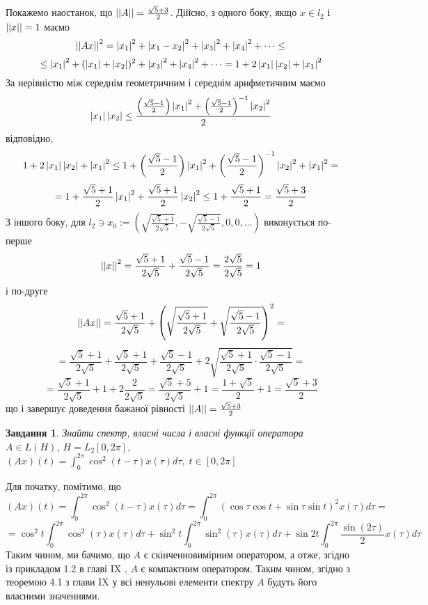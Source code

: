 \documentclass[12pt]{article} %
\newtheorem{prob}{Завдання}
\begin{document}
	Покажемо наостанок, що $\left|\left|A\right|\right|=\frac{\sqrt{5}+3}{2}$. Дійсно, з одного боку, якщо $x\in l_2$ і $\left|\left|x\right|\right|=1$ маємо
	\[\left|\left|Ax\right|\right|^2=\left|x_1\right|^2+\left|x_1-x_2\right|^2+\left|x_3\right|^2+\left|x_4\right|^2+\dots\leq\]
	\[\leq \left|x_1\right|^2+(\left|x_1\right|+\left|x_2\right|)^2+\left|x_3\right|^2+\left|x_4\right|^2+\dots=1+2\left|x_1\right|\left|x_2\right|+\left|x_1\right|^2\]
	За нерівністю між середнім геометричним і середнім арифметичним маємо
	\[\left|x_1\right|\left|x_2\right|\leq\frac{\left({\frac{\sqrt{5}-1}{2}}\right)\left|x_1\right|^2+\left(\frac{\sqrt{5}-1}{2}\right)^{-1}\left|x_2\right|^2}{2}\]
	відповідно,
	\[1+2\left|x_1\right|\left|x_2\right|+\left|x_1\right|^2
	\leq1+\left({\frac{\sqrt{5}-1}{2}}\right)\left|x_1\right|^2+\left(\frac{\sqrt{5}-1}{2}\right)^{-1}\left|x_2\right|^2+\left|x_1\right|^2=\]
	\[=1+\frac{\sqrt{5}+1}{2}\left|x_1\right|^2+\frac{\sqrt{5}+1}{2}\left|x_2\right|^2\leq 1+\frac{\sqrt{5}+1}{2}=\frac{\sqrt{5}+3}{2}\]
	З іншого боку, для $l_2\ni x_0:=(\sqrt{\frac{\sqrt{5}+1}{2\sqrt{5}}},-\sqrt{\frac{\sqrt{5}-1}{2\sqrt{5}}},0,0,\dots)$ виконується
	по-перше
	\[\left|\left|x\right|\right|^2=\frac{\sqrt{5}+1}{2\sqrt{5}}+\frac{\sqrt{5}-1}{2\sqrt{5}}=\frac{2\sqrt{5}}{2\sqrt{5}}=1\]
	і по-друге
	\[\left|\left|Ax\right|\right|=\frac{\sqrt{5}+1}{2\sqrt{5}}+\left(\sqrt{\frac{\sqrt{5}+1}{2\sqrt{5}}}+\sqrt{\frac{\sqrt{5}-1}{2\sqrt{5}}}\right)^2=\]\[=
	\frac{\sqrt{5}+1}{2\sqrt{5}}+\frac{\sqrt{5}+1}{2\sqrt{5}}+{\frac{\sqrt{5}-1}{2\sqrt{5}}}+2\sqrt{
	\frac{\sqrt{5}+1}{2\sqrt{5}}\cdot\frac{\sqrt{5}-1}{2\sqrt{5}}}=\]
	\[=\frac{\sqrt{5}+1}{2\sqrt{5}}+1+2\frac{2}{2\sqrt{5}}=\frac{\sqrt{5}+5}{2\sqrt{5}}+1=\frac{1+\sqrt{5}}{2}+1=\frac{\sqrt{5}+3}{2}\]
	що і завершує доведення бажаної рівності $\left|\left|A\right|\right|=\frac{\sqrt{5}+3}{2}$
\begin{prob}Знайти спектр, власні числа і власні функції оператора $A\in L(H)$, $H=L_2[0,2\pi]$, $(Ax)(t)=\int_0^{2\pi}\cos^2(t-\tau)x(\tau)
	d\tau,\;t\in[0,2\pi]$
\end{prob}
Для початку, помітимо, що
\newcommand{\myint}[1]{\int_0^{2\pi}#1x(\tau)d\tau}
\[(Ax)(t)=\int_0^{2\pi}\cos^2(t-\tau)x(\tau)d\tau=\int_0^{2\pi}(\cos\tau\cos t+\sin\tau\sin t)^2x(\tau)d\tau=\]
\[=\cos^2 t\myint{\cos^2(\tau)}+\sin^2 t\myint{\sin^2(\tau)}+\sin 2t\myint{\frac{\sin (2\tau)}{2}}\]
Таким чином, ми бачимо, що $A$ є скінченновимірним оператором, а отже, згідно із прикладом 1.2 в главі IX \cite{tb}, 
$A$ є компактним оператором. Таким чином, згідно з теоремою 4.1 з глави IX у \cite{tb} всі ненульові елементи спектру $A$ будуть його власними
значеннями.
\end{document}
